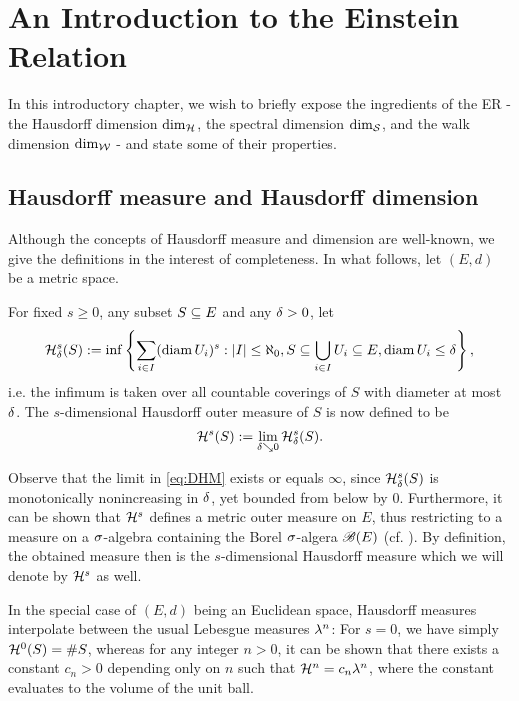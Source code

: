 \chapter{An Introduction to the Einstein Relation}

In this introductory chapter, we wish to briefly expose the ingredients of the ER - the Hausdorff dimension $\dim_{\mathcal{H}}$, the spectral dimension $\dim_{\mathcal{S}}$, and the walk dimension $\dim_{\mathcal{W}}$ - and state some of their properties. 

\section{Hausdorff measure and Hausdorff dimension}

Although the concepts of Hausdorff measure and dimension are well-known, we give the definitions in the interest of completeness. In what follows, let $(E,d)$ be a metric space.
\begin{defin}
  For fixed $s\geq0$, any subset $S\subseteq E$ and any $\delta>0$, let 
  \[
    \mathcal{H}^s_\delta(S)
      :=\inf \left\{\sum_{i\in I}(\operatorname{diam} U_i)^s:
            |I|\leq\aleph_0,S\subseteq\bigcup_{i\in I}U_i\subseteq E,\operatorname{diam} U_i\leq\delta\right\},
  \]
  i.e. the infimum is taken over all countable coverings of $S$ with diameter at most $\delta$. The $s$-dimensional Hausdorff outer measure of $S$ is now defined to be
  \begin{equation}\label{eq:DHM}
    \mathcal{H}^s(S):=\lim_{\delta\searrow0}\mathcal{H}^s_\delta(S).
  \end{equation}
\end{defin}
Observe that the limit in \eqref{eq:DHM} exists or equals $\infty$, since $\mathcal{H}^s_\delta(S)$ is monotonically nonincreasing in $\delta$, yet bounded from below by 0. Furthermore, it can be shown that $\mathcal{H}^s$ defines a metric outer measure on $E$, thus restricting to a measure on a $\sigma$-algebra containing the Borel $\sigma$-algera $\mathscr{B}(E)$ (cf. \cite[p.54ff]{mattila1999geometry}). By definition, the obtained measure then is the $s$-dimensional Hausdorff measure which we will denote by $\mathcal{H}^s$ as well.

In the special case of $(E,d)$ being an Euclidean space, Hausdorff measures interpolate between the usual Lebesgue measures $\lambda^n$: For $s=0$, we have simply $\mathcal{H}^0(S)=\# S$, whereas for any integer $n>0$, it can be shown that there exists a constant $c_n>0$ depending only on $n$ such that $\mathcal{H}^n=c_n\lambda^n$, where the constant evaluates to the volume of the unit ball.

